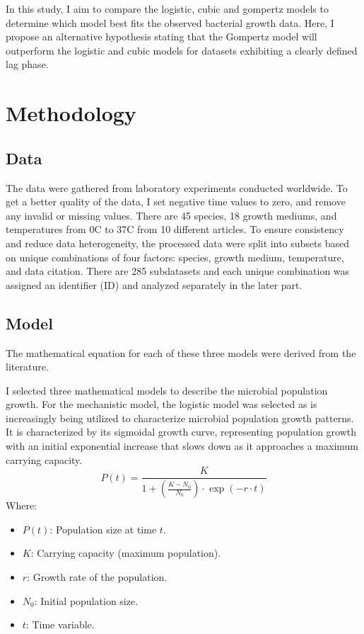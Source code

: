 \documentclass{article}
\begin{document}
In this study, I aim to compare the logistic, cubic and gompertz models to determine which model best fits the observed bacterial growth data. Here, I propose an alternative hypothesis stating that the Gompertz model will outperform the logistic and cubic models for datasets exhibiting a clearly defined lag phase.

\section{Methodology}
\subsection{Data}
The data were gathered from laboratory experiments conducted worldwide. To get a better quality of the data, I set negative time values to zero, and remove any invalid or missing values. There are 45 species, 18 growth mediums, and temperatures from 0\degree C to 37\degree C from 10 different articles. To ensure consistency and reduce data heterogeneity, the processed data were split into subsets based on unique combinations of four factors: species, growth medium, temperature, and data citation. There are 285 subdatasets and each unique combination was assigned an identifier (ID) and analyzed separately in the later part.

\subsection{Model}
The mathematical equation for each of these three models were derived from the literature.

I selected three mathematical models to describe the microbial population growth. For the mechanistic model, the logistic model was selected as is increasingly being utilized to characterize microbial population growth patterns.\cite{johnson2004model} It is characterized by its sigmoidal growth curve, representing population growth with an initial exponential increase that slows down as it approaches a maximum carrying capacity. 
\begin{equation}
P(t) = \frac{K}{1 + \left(\frac{K - N_0}{N_0}\right) \cdot \exp(-r \cdot t)}
\end{equation}
Where:
\begin{itemize}
    \item \( P(t) \): Population size at time \( t \).
    \item \( K \): Carrying capacity (maximum population).
    \item \( r \): Growth rate of the population.
    \item \( N_0 \): Initial population size.
    \item \( t \): Time variable.
\end{itemize}
\end{document}
